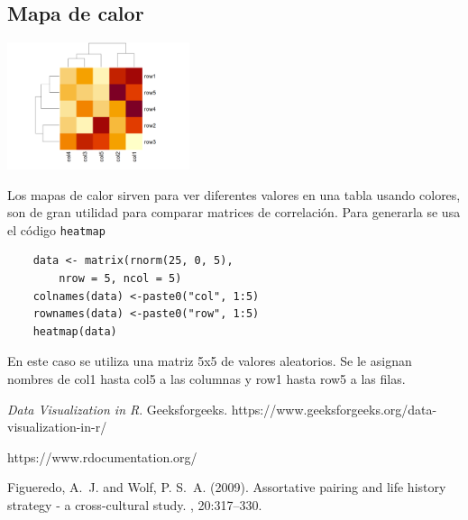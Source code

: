 \documentclass[twoside,twocolumn]{article}
\begin{document}
\subsection{Mapa de calor}

\begin{center}
    \includegraphics[width=0.4\textwidth]{images/heatmap.png}
\end{center}

Los mapas de calor sirven para ver diferentes valores en una tabla usando colores, son de gran utilidad para comparar matrices de correlación. Para generarla se usa el código \verb|heatmap|

\begin{verbatim}
    data <- matrix(rnorm(25, 0, 5),
        nrow = 5, ncol = 5)
    colnames(data) <-paste0("col", 1:5)
    rownames(data) <-paste0("row", 1:5)
    heatmap(data)   
\end{verbatim}

En este caso se utiliza una matriz 5x5 de valores aleatorios. Se le asignan nombres de col1 hasta col5 a las columnas y row1 hasta row5 a las filas. 



\begin{thebibliography}{99} %

\bibitem[bhartirishika, 2022]{}\textit{Data Visualization in R}. Geeksforgeeks. https://www.geeksforgeeks.org/data-visualization-in-r/

\bibitem[RDocumentation]{}https://www.rdocumentation.org/

Figueredo, A.~J. and Wolf, P. S.~A. (2009).
\newblock Assortative pairing and life history strategy - a cross-cultural
  study.
, 20:317--330.
 
\end{thebibliography}

\end{document}
